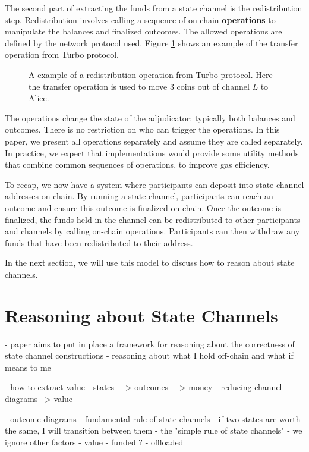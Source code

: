 \documentclass{article}
\begin{document}
The second part of extracting the funds from a state channel is the redistribution step.
Redistribution involves calling a sequence of on-chain \textbf{operations} to manipulate
the balances and finalized outcomes.
The allowed operations are defined by the network protocol used.
Figure \ref{fig:redistribution} shows an example of the transfer operation from Turbo protocol.

\begin{figure}[h]\centering
  \makebox[\textwidth][c]{}
  \caption{
    A example of a redistribution operation from Turbo protocol.
    Here the transfer operation is used to move $3$ coins out of channel $L$ to Alice.
  }\label{fig:redistribution}
\end{figure}

The operations change the state of the adjudicator: typically both balances and outcomes.
There is no restriction on who can trigger the operations.
In this paper, we present all operations separately and assume they are called separately.
In practice, we expect that implementations would provide some utility methods that combine
common sequences of operations, to improve gas efficiency.

To recap, we now have a system where participants can deposit into state channel addresses on-chain.
By running a state channel, participants can reach an outcome and ensure this outcome is finalized on-chain.
Once the outcome is finalized, the funds held in the channel can be redistributed to other participants and channels by calling on-chain operations.
Participants can then withdraw any funds that have been redistributed to their address.

In the next section, we will use this model to discuss how to reason about state channels.

\section{Reasoning about State Channels}\label{sec:reasoning}

- paper aims to put in place a framework for reasoning about the correctness of state channel constructions
- reasoning about what I hold off-chain and what if means to me


- how to extract value
- states ---> outcomes ---> money
- reducing channel diagrams --> value

- outcome diagrams
- fundamental rule of state channels - if two states are worth the same, I will transition between them
- the "simple rule of state channels" - we ignore other factors
- value
- funded ?
- offloaded
\end{document}
